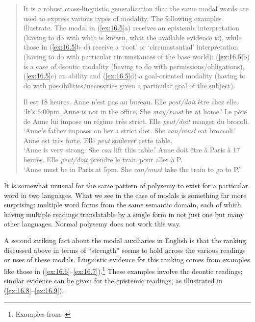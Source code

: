 \begin{quote}
It is a robust cross-linguistic generalization that the same modal words are used to express various types of modality. The following  examples illustrate. The modal in (\ref{ex:16.5}a) receives an epistemic interpretation (having to do with what is known, what the available evidence is), while those in (\ref{ex:16.5}b--d) receive a ‘root’ or ‘circumstantial’ interpretation (having to do with particular circumstances of the base world): (\ref{ex:16.5}b) is a case of deontic modality (having to do with permissions/obligations), (\ref{ex:16.5}c) an ability and (\ref{ex:16.5}d) a goal-oriented modality (having to do with possibilities/necessities given a particular goal of the subject).

\ea \label{ex:16.5}
\ea   Il est 18 heures. Anne n’est pas au bureau. Elle \textit{peut/doit} être chez elle.\\
\glt ‘It’s 6:00pm. Anne is not in the office. She \textit{may/must} be at home.’
\ex   Le père de Anne lui impose un régime très strict. Elle \textit{peut/doit} manger du brocoli.\\
\glt ‘Anne’s father imposes on her a strict diet. She \textit{can/must} eat broccoli.’
\ex Anne est très forte. Elle \textit{peut} soulever cette table.\\
\glt ‘Anne is very strong. She \textit{can} lift this table.’
\ex  Anne doit être à Paris à 17 heures. Elle \textit{peut/doit} prendre le train pour aller à P.\\
\glt ‘Anne must be in Paris at 5pm. She \textit{can/must} take the train to go to P.’
\z \z
\end{quote}


It is somewhat unusual for the same pattern of polysemy to exist for a particular word in two languages. What we see in the case of modals is something far more surprising: multiple word forms from the same semantic domain, each of which having multiple readings translatable by a single form in not just one but many other languages. Normal polysemy does not work this way.



A second striking fact about the modal auxiliaries in English is that the ranking discussed above in terms of “strength” seems to hold across the various readings or uses of these modals. Linguistic evidence for this ranking comes from examples like those in (\ref{ex:16.6}--\ref{ex:16.7}).\footnote{Examples from \citet{vonFintel2006}.} These examples involve the deontic readings; similar evidence can be given for the epistemic readings, as illustrated in (\ref{ex:16.8}--\ref{ex:16.9}).


